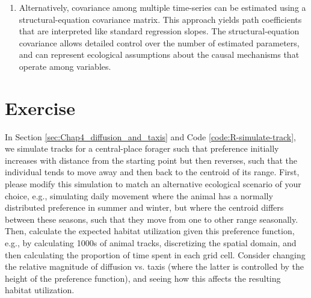 \begin{enumerate}
    \item Alternatively, covariance among multiple time-series can be estimated using a structural-equation covariance matrix.  This approach yields path coefficients that are interpreted like standard regression slopes.  The structural-equation covariance allows detailed control over the number of estimated parameters, and can represent ecological assumptions about the causal mechanisms that operate among variables.  
\end{enumerate}

\section{Exercise}

In Section \ref{sec:Chap4_diffusion_and_taxis} and Code \ref{code:R-simulate-track}, we simulate tracks for a central-place forager such that preference initially increases with distance from the starting point but then reverses, such that the individual tends to move away and then back to the centroid of its range.  First, please modify this simulation to match an alternative ecological scenario of your choice, e.g., simulating daily movement where the animal has a normally distributed preference in summer and winter, but where the centroid differs between these seasons, such that they move from one to other range seasonally.  Then, calculate the expected habitat utilization given this preference function, e.g., by calculating 1000s of animal tracks, discretizing the spatial domain, and then calculating the proportion of time spent in each grid cell.  Consider changing the relative magnitude of diffusion vs. taxis (where the latter is controlled by the height of the preference function), and seeing how this affects the resulting habitat utilization.  

